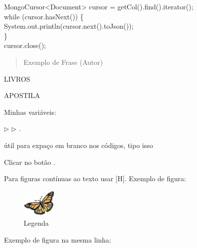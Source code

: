 \documentclass[a4paper,11pt]{article}
\begin{document}
{\ttfamily MongoCursor<Document> cursor = getCol().find().iterator(); \\
	while (cursor.hasNext()) \{ \\
	\phantom{x}\hspace{4pt} System.out.println(cursor.next().toJson()); \\
	\} \\
	cursor.close(); }

\begin{quotation}
	Exemplo de Frase (Autor)
\end{quotation}

LIVROS

\begin{note}[Socorro]{}
	\lipsum[4-1]
\end{note}

APOSTILA

\begin{theo}[]{}
	\lipsum[4-1]
\end{theo}

\begin{theo}{}
	\lipsum[4-1]
\end{theo}

Minhas variáveis:

 $\triangleright$  $\triangleright$ .

\aspas{ } útil para expaço em branco nos códigos, tipo isso


Clicar no botão .

Para figuras contínuas ao texto usar [H]. Exemplo de figura:
\begin{figure}[H]
	\centering
	\includegraphics[width=0.15\textwidth]{imagens/exemplo.jpg}
	\caption{Legenda}
\end{figure}

Exemplo de figura na mesma linha:
\end{document}

